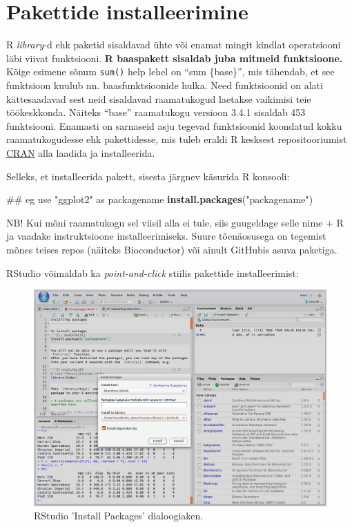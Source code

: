 \documentclass[]{book}
\newenvironment{Shaded}{\begin{snugshade}}{\end{snugshade}}
\newcommand{\KeywordTok}[1]{\textcolor[rgb]{0.13,0.29,0.53}{\textbf{#1}}}
\newcommand{\StringTok}[1]{\textcolor[rgb]{0.31,0.60,0.02}{#1}}
\newcommand{\NormalTok}[1]{#1}
\begin{document}
\section{Pakettide installeerimine}\label{libs}

R \emph{library}-d ehk paketid sisaldavad ühte või enamat mingit kindlat
operatsiooni läbi viivat funktsiooni. \textbf{R baaspakett sisaldab juba
mitmeid funktsioone.} Kõige esimene sõnum \texttt{sum()} help lehel on
``sum \{base\}'', mis tähendab, et see funktsioon kuulub nn.
baasfunktsioonide hulka. Need funktsioonid on alati kättesaadavad sest
neid sisaldavad raamatukogud laetakse vaikimisi teie töökeskkonda.
Näiteks ``base'' raamatukogu versioon 3.4.1 sisaldab 453 funktsiooni.
Enamasti on sarnaseid asju tegevad funktsioonid koondatud kokku
raamatukogudesse ehk pakettidesse, mis tuleb eraldi R kesksest
repositooriumist \href{https://cran.r-project.org}{CRAN} alla laadida ja
installeerida.

Selleks, et installeerida pakett, sisesta järgnev käsurida R konsooli:

\begin{Shaded}
\begin{Highlighting}[]
\NormalTok{## eg use "ggplot2" as packagename}
\KeywordTok{install.packages}\NormalTok{(}\StringTok{"packagename"}\NormalTok{)}
\end{Highlighting}
\end{Shaded}

NB! Kui mõni raamatukogu sel viisil alla ei tule, siis guugeldage selle
nime + R ja vaadake instruktsioone installeerimiseks. Suure tõenäosusega
on tegemist mõnes teises repos (näiteks Bioconductor) või ainult
GitHubis asuva paketiga.

RStudio võimaldab ka \emph{point-and-click} stiilis pakettide
installeerimist:

\begin{figure}
\includegraphics[width=16.85in]{assets/img/RStudio_package.install} \caption{RStudio 'Install Packages' dialoogiaken.}\label{fig:unnamed-chunk-2}
\end{figure}
\end{document}
